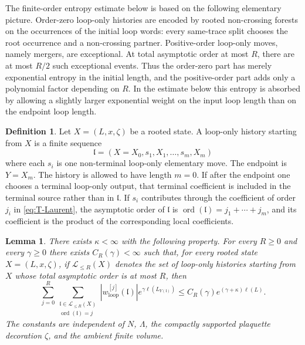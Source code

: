 \documentclass[11pt,a4paper,reqno]{amsart}
\newtheorem{lemma}[theorem]{Lemma}
\theoremstyle{definition}
\newtheorem{definition}[theorem]{Definition}
\theoremstyle{remark}
\begin{document}
The finite-order entropy estimate below is based on the following elementary picture.  Order-zero loop-only histories are encoded by rooted non-crossing forests on the occurrences of the initial loop words: every same-trace split chooses the root occurrence and a non-crossing partner.  Positive-order loop-only moves, namely mergers, are exceptional.  At total asymptotic order at most $R$, there are at most $R/2$ such exceptional events.  Thus the order-zero part has merely exponential entropy in the initial length, and the positive-order part adds only a polynomial factor depending on $R$.  In the estimate below this entropy is absorbed by allowing a slightly larger exponential weight on the input loop length than on the endpoint loop length.

\begin{definition}
Let $X=(L,x,\zeta)$ be a rooted state.  A loop-only history starting from $X$ is a finite sequence
\[
\mathfrak l=(X=X_0,s_1,X_1,\ldots,s_m,X_m)
\]
where each $s_i$ is one non-terminal loop-only elementary move.  The endpoint is $Y=X_m$.  The history is allowed to have length $m=0$.  If after the endpoint one chooses a terminal loop-only output, that terminal coefficient is included in the terminal source rather than in $\mathfrak l$.  If $s_i$ contributes through the coefficient of order $j_i$ in \eqref{eq:T-Laurent}, the asymptotic order of $\mathfrak l$ is $\operatorname{ord}(\mathfrak l)=j_1+\cdots+j_m$, and its coefficient is the product of the corresponding local coefficients.
\end{definition}


\begin{lemma}\label{lem:loop-only-entropy}
There exists $\kappa<\infty$ with the following property.  For every $R\ge0$ and every $\gamma\ge0$ there exists $C_R(\gamma)<\infty$ such that, for every rooted state $X=(L,x,\zeta)$, if $\mathcal L_{\le R}(X)$ denotes the set of loop-only histories starting from $X$ whose total asymptotic order is at most $R$, then
\begin{equation}\label{eq:loop-only-entropy}
\sum_{j=0}^R\sum_{\substack{\mathfrak l\in\mathcal L_{\le R}(X)\\
\operatorname{ord}(\mathfrak l)=j}}
|w^{[j]}_{\mathrm{loop}}(\mathfrak l)| e^{\gamma\ell(L_{Y(\mathfrak l)})}
\le
C_R(\gamma)e^{(\gamma+\kappa)\ell(L)}.
\end{equation}
The constants are independent of $N$, $\Lambda$, the compactly supported plaquette decoration $\zeta$, and the ambient finite volume.
\end{lemma}
\end{document}

